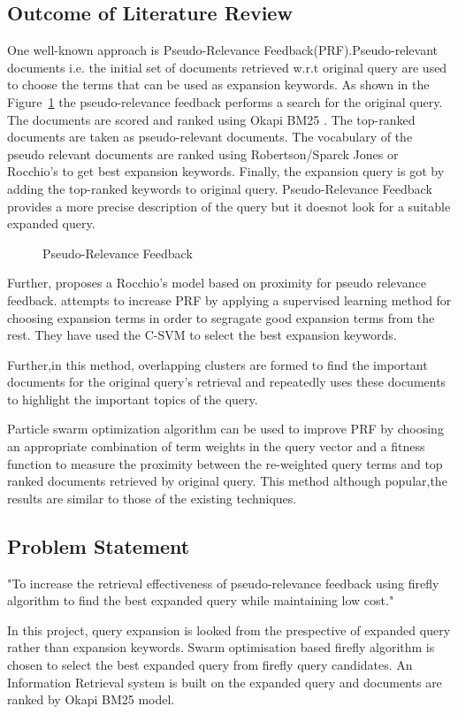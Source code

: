 \documentclass{nitk}
\begin{document}
\subsection{Outcome of Literature Review}
One well-known approach is Pseudo-Relevance Feedback(PRF).Pseudo-relevant documents i.e. the initial set of documents retrieved w.r.t original query are used to choose the terms that can be used as expansion keywords.\cite{PRF} As shown in the Figure~\ref{fig:prf} the pseudo-relevance feedback performs a search for the original query. The documents are scored and ranked using Okapi BM25 \cite{okapi}. The top-ranked documents are taken as  pseudo-relevant documents. The vocabulary of the pseudo relevant documents are ranked using Robertson/Sparck Jones or Rocchio's to get best expansion keywords. Finally, the expansion query is got  by adding the top-ranked keywords to original query. Pseudo-Relevance Feedback provides a more precise description of the query but it doesnot look for a suitable expanded query.
\begin{figure}[!htb]

\caption{Pseudo-Relevance Feedback}
\label{fig:prf}
\end{figure}
Further, \cite{Rocchio} proposes a Rocchio's model based on proximity for pseudo relevance feedback. 
\cite{enhancedprf} attempts to increase PRF by applying a supervised learning method for choosing expansion terms in order to segragate good expansion terms from the rest. They have used  the C-SVM to select the best expansion keywords.

Further,in this method\cite{cluster}, overlapping clusters are formed to find the important documents for the original query's retrieval and repeatedly uses these documents to highlight the important topics of the query.

Particle swarm optimization algorithm can be used to improve PRF by choosing an appropriate combination of term weights in the query vector and a fitness function to measure the proximity between the re-weighted query terms and top ranked documents retrieved by original query. This method although popular,the results are similar to those of the existing techniques.
\subsection{Problem Statement}
"To increase the retrieval effectiveness of pseudo-relevance feedback using firefly algorithm to find the best expanded query while maintaining low cost."

In this project, query expansion is looked from the prespective of expanded query rather than expansion keywords. Swarm optimisation based firefly algorithm is chosen to select the best expanded query from firefly query candidates. An Information Retrieval system is built on the expanded query and documents are ranked by Okapi BM25 model.
\end{document}
